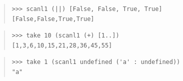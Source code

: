 \begin{haddockdesc}
{\begin{quote}
{\begin{verbatim}
\end{verbatim}}
\end{quote}
\begin{quote}
{\haddockverb\begin{verbatim}
>>> scanl1 (||) [False, False, True, True]
[False,False,True,True]

\end{verbatim}}
\end{quote}
\begin{quote}
{\haddockverb\begin{verbatim}
>>> take 10 (scanl1 (+) [1..])
[1,3,6,10,15,21,28,36,45,55]

\end{verbatim}}
\end{quote}
\begin{quote}
{\haddockverb\begin{verbatim}
>>> take 1 (scanl1 undefined ('a' : undefined))
"a"

\end{verbatim}}
\end{quote}}
\end{haddockdesc}
